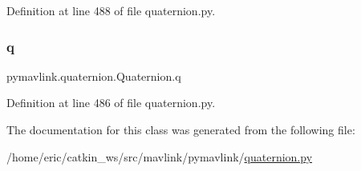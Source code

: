 Definition at line 488 of file quaternion.\+py.

\mbox{\label{classpymavlink_1_1quaternion_1_1Quaternion_a5c0501ca85af5084c918bc443bb714fd}} 
\subsubsection{\texorpdfstring{q}{q}}
{\footnotesize\ttfamily pymavlink.\+quaternion.\+Quaternion.\+q}



Definition at line 486 of file quaternion.\+py.



The documentation for this class was generated from the following file\+:\begin{DoxyCompactItemize}
\item 
/home/eric/catkin\+\_\+ws/src/mavlink/pymavlink/\mbox{\hyperlink{quaternion_8py}{quaternion.\+py}}\end{DoxyCompactItemize}
